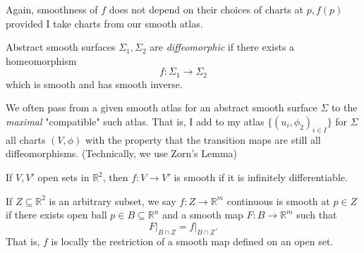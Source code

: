 \begin{note}
    Again, smoothness of \(f\) does not depend on their choices of charts at \(p, f(p)\) provided I take charts from our smooth atlas.
\end{note}
\begin{definition}{}{}
    Abstract smooth surfaces \(\Sigma_1, \Sigma_2\) are \textit{diffeomorphic}  if there exists a homeomorphism
    \[
        f: \Sigma_1 \to \Sigma_2
    \]
    which is smooth and has smooth inverse.
\end{definition}
\begin{remark}
    We often pass from a given smooth atlas for an abstract smooth surface \(\Sigma\) to the \textit{maximal} "compatible" such atlas. That is, I add to my atlas \(\{(u_i, \phi_2)_{i\in I}\}\) for \(\Sigma\) all charts \((V, \phi)\) with the property that the transition maps are still all diffeomorphisms. (Technically, we use Zorn's Lemma)
\end{remark}

If \(V, V'\) open sets in \(\mathbb{R}^2\), then \(f: V \to V'\) is smooth if it is infinitely differentiable.

\begin{definition}{}{}
    If \(Z \subseteq \mathbb{R}^2\) is an arbitrary subset, we say \(f: Z \to \mathbb{R}^m\) continuous is smooth at \(p \in Z\) if there exists open ball \(p \in B \subseteq \mathbb{R}^n\) and a smooth map \(F: B \to \mathbb{R}^m\) such that
    \[
        \left. F \right|_{B\cap Z} = \left. f \right|_{B\cap Z}.
    \]
    That is, \(f\) is locally the restriction of a smooth map defined on an open set.
\end{definition}

